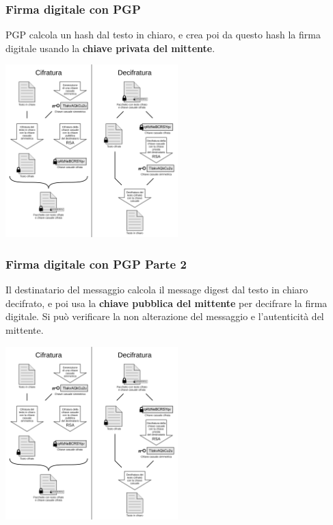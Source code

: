 \begin{frame}
	\frametitle{Firma digitale con PGP}
	PGP calcola un hash dal testo in chiaro, e crea poi da questo hash la firma digitale usando la  \textbf{chiave privata del mittente}.
	\begin{center}
		\includegraphics[width=0.5\textwidth]{img/1-img/PGP_diagram_IT.png}
	\end{center}
\end{frame}

\begin{frame}
	\frametitle{Firma digitale con PGP Parte 2}
	Il destinatario del messaggio calcola il message digest dal testo in chiaro decifrato, e poi usa la \textbf{chiave pubblica del mittente} per decifrare la firma digitale.
	Si può verificare la non alterazione del messaggio e l'autenticità del mittente.

	\begin{center}
		\includegraphics[width=0.5\textwidth]{img/1-img/PGP_diagram_IT.png}
	\end{center}
\end{frame}


